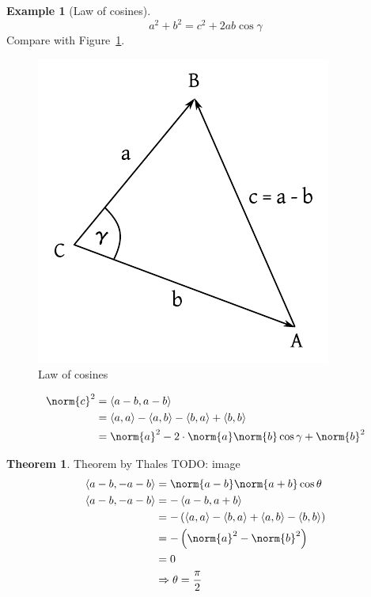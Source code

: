\documentclass[a4paper,landscape,twocolumn]{article}
\newcommand\functional[1]{\left\langle{#1}\right\rangle}
\theoremstyle{definition}
\newtheorem{theorem}{Theorem}
\newtheorem{ex}{Example}
\DeclarePairedDelimiter\norm\lVert\rVert
\begin{document}
\begin{ex}[Law of cosines]
  \label{ex-8.5}
  \[ a^2 + b^2 = c^2 + 2ab \cos{\gamma} \]
  Compare with Figure~\ref{img:law-of-cosines}.
  \begin{figure}[!h]
    \begin{center}
      \includegraphics{img/law-of-cosines.pdf}
      \caption{Law of cosines}
      \label{img:law-of-cosines}
    \end{center}
  \end{figure}

  \begin{align*}
    \norm{c}^2 &= \functional{a-b, a-b} \\
      &= \functional{a,a} - \functional{a,b} - \functional{b,a} + \functional{b,b} \\
      &= \norm{a}^2 - 2 \cdot \norm{a} \norm{b} \cos{\gamma} + \norm{b}^2
  \end{align*}
\end{ex}

\begin{theorem}{Theorem by Thales}
  TODO: image
  \begin{align*}
    \functional{a-b, -a-b} &= \norm{a-b} \norm{a+b} \cos\theta \\
    \functional{a-b, -a-b} &= -\functional{a-b, a+b} \\
      &= -\left(\functional{a,a} - \functional{b,a} + \functional{a,b} - \functional{b,b}\right) \\
      &= -\left(\norm{a}^2 - \norm{b}^2\right) \\
      &= 0 \\
      &\Rightarrow \theta = \frac\pi2
  \end{align*}
\end{theorem}
\end{document}
